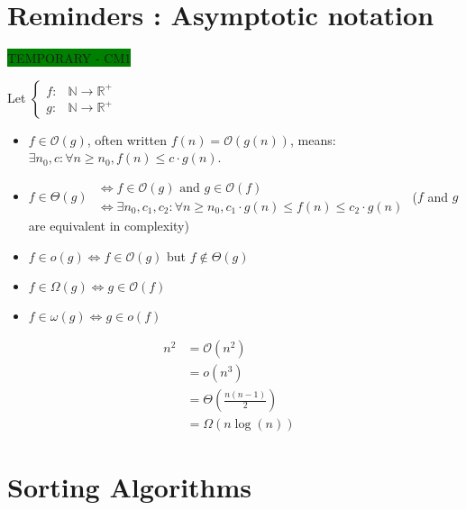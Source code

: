 \chapter{Reminders : Asymptotic notation}

\colorbox{green}{TEMPORARY - CM1}

Let 
$ \left\{
\begin{array}{ll}
f :& \mathbb{N} \rightarrow \mathbb{R}^+\\
g :& \mathbb{N} \rightarrow \mathbb{R}^+
\end{array} \right.$ 

\begin{itemize}
\renewcommand{\labelitemi}{$\bullet$}
	\item  $f \in \mathcal{O}(g)$, often written $f(n) = \mathcal{O}(g(n))$, means: $\exists n_0, c : \forall n \geq n_0, f(n) \leq c \cdot g(n)$.
	\item 	
	$f \in \Theta(g)$ $\begin{array}{l} 
	   \Leftrightarrow f \in \mathcal{O}(g)  \text{ and } g \in \mathcal{O}(f) \\
	\Leftrightarrow  \exists n_0, c_1, c_2 : \forall n\geq n_0, c_1 \cdot g(n)\leq f(n) \leq c_2 \cdot g(n) 
	\end{array}$	
	($f$ and $g$ are equivalent in complexity)
\item $f \in o(g) \Leftrightarrow f \in \mathcal{O}(g)$ but $f \notin \Theta(g)$
\item  $f \in \Omega(g) \Leftrightarrow g \in \mathcal{O}(f)$
\item $f \in \omega(g) \Leftrightarrow g \in o(f)$
\end{itemize}

\vspace{0.5cm}
\begin{example}
\begin{leftbar}
\begin{align*} 
	   n^2 & = \mathcal{O}(n^2) &\\
		 & = o(n^3) &\\
		 & = \Theta \left(\frac{n (n-1)}{2}\right) &\\
		& = \Omega (n \log (n))& 
	\end{align*}
	\end{leftbar}
\end{example}


\chapter{Sorting Algorithms}

